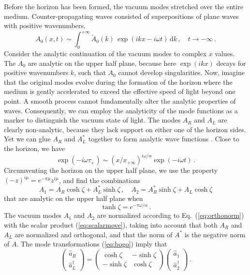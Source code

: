 \documentclass[12pt,amsmath,amssymb]{article}
\numberwithin{equation}{section}
\begin{document}
Before the horizon has been formed, the vacuum modes stretched
over the entire medium. Counter-propagating waves consisted
of superpositions of plane waves with positive wavenumbers,
\begin{equation}
A_0(x,t)\sim \int_0^{+\infty} \widetilde{A}_0(k)\,
\exp(ikx - i\omega t)\,\mathrm{d}k \,,\quad
t \rightarrow -\infty \,.
\end{equation}
Consider the analytic continuation of the vacuum modes
to complex $x$ values. The $A_0$ are analytic on the upper
half plane, because here $\exp(ikx)$ decays for positive
wavenumbers $k$, such that $A_0$ cannot develop
singularities. Now, imagine that the original modes evolve during the
formation of the horizon where the medium is gently
accelerated to exceed the effective speed of light beyond one point.
A smooth process cannot fundamentally alter the analytic
properties of waves.
Consequently, we can employ the analyticity of the mode functions
as a marker to distinguish the vacuum state of light.
The modes $A_R$ and $A_L$ are clearly non-analytic, because
they lack support on either one of the horizon sides.
Yet we can glue $A_R$ and $A_L^*$ together to form
analytic wave functions \cite{Brout}.
Close to the horizon, we have
\begin{equation}
\exp(-i\omega\tau_+) \sim (x/x_{+\infty})^{i\omega/\alpha}
\exp(-i\omega t) \,.
\end{equation}
Circumventing the horizon on the upper half plane, we use the property
$(-z)^{i\mu} = e^{-\pi\mu} z^{i\mu}$,
and find the combinations
\begin{equation}
\label{eq:bogo}
A_1 = A_R \cosh\zeta + A_L^*\sinh\zeta \,,\quad
A_2 = A_R^* \sinh\zeta + A_L\cosh\zeta
\end{equation}
that are analytic on the upper half plane when
\begin{equation}
\tanh\zeta = e^{-\pi\omega/\alpha} \,.
\end{equation}
The vacuum modes $A_1$ and $A_2$ are normalized according
to Eq.\ (\ref{eq:orthonorm}) with the scalar product
(\ref{eq:scalarmove}), taking into account
that both $A_R$ and $A_L$ are normalized and orthogonal,
and that the norm of $A^*$ is the negative norm of $A$.
The mode transformations (\ref{eq:bogo}) imply that
\begin{equation}
\left(
    \begin{array}{c}
     \hat{a}_R  \\
     \hat{a}_L^\dagger
    \end{array}
\right) =
\left(
    \begin{array}{cc}
      \cosh\zeta & -\sinh\zeta \\
      -\sinh\zeta & \cosh\zeta
    \end{array}
\right)
\left(
    \begin{array}{c}
     \hat{a}_1  \\
     \hat{a}_2^\dagger
    \end{array}
\right) \,.
\end{equation}
\end{document}
